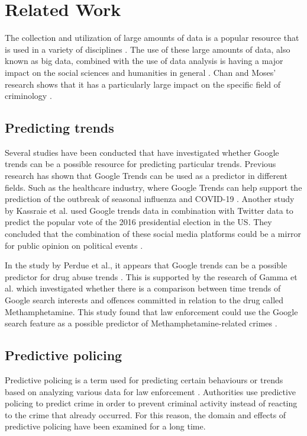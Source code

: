 \section{Related Work}

The collection and utilization of large amounts of data is a popular resource that is used in a variety of disciplines \cite{Siegel}. The use of these large amounts of data, also known as big data, combined with the use of data analysis is having a major impact on the social sciences and humanities in general \cite{Kitchin}. Chan and Moses' research shows that it has a particularly large impact on the specific field of criminology \cite{Chan}.

\subsection{Predicting trends}

Several studies have been conducted that have investigated whether Google trends can be a possible resource for predicting particular trends. Previous research has shown that Google Trends can be used as a predictor in different fields. Such as the healthcare industry, where Google Trends can help support the prediction of the outbreak of seasonal influenza and COVID-19 \cite{zhang, venkatesh}. Another study by Kassraie et al. used Google trends data in combination with Twitter data to predict the popular vote of the 2016 presidential election in the US. They concluded that the combination of these social media platforms could be a mirror for public opinion on political events \cite{kassraie}.

In the study by Perdue et al., it appears that Google trends can be a possible predictor for drug abuse trends \cite{perdue}. This is supported by the research of Gamma et al. which investigated whether there is a comparison between time trends of Google search interests and offences committed in relation to the drug called Methamphetamine. This study found that law enforcement could use the Google search feature as a possible predictor of Methamphetamine-related crimes \cite{gamma}.

\subsection{Predictive policing}

Predictive policing is a term used for predicting certain behaviours or trends based on analyzing various data for law enforcement \cite{pearsall}. Authorities use predictive policing to predict crime in order to prevent criminal activity instead of reacting to the crime that already occurred. For this reason, the domain and effects of predictive policing have been examined for a long time. 

